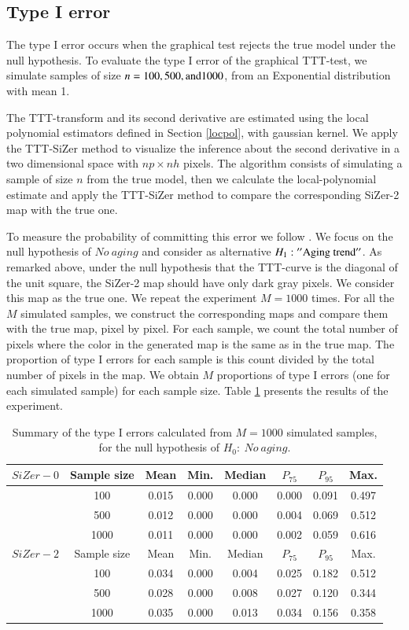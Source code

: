 \documentclass[preprint,12pt]{elsarticle}
\begin{document}
\subsection{Type I error}
The type I error occurs when the graphical test rejects the true model under the null hypothesis. To evaluate the type I error of the graphical TTT-test, we simulate samples of size $n = 100, 500, {\rm and } 1000$, from an Exponential distribution with mean 1.

The TTT-transform and its second derivative are estimated using the local polynomial estimators defined in Section \ref{locpol}, with gaussian kernel. We apply the  TTT-SiZer method to visualize the inference about the second derivative in a two dimensional space with $np \times nh$ pixels.  
The algorithm consists of simulating a sample of size $n$ from the true model, then we calculate the local-polynomial estimate and apply the TTT-SiZer method to compare the corresponding SiZer-2 map with the true one.

To measure the probability of committing this error we follow \cite{RMP07}. We focus on the null hypothesis of $No \ aging$ and consider as alternative $H_1: {\rm ''Aging \ trend''}$.
As remarked above, under the null hypothesis that the TTT-curve is the diagonal of the unit square, the SiZer-2 map  should have only dark gray pixels. We consider this map as the true one. We repeat the experiment $M=1000$ times.  For all the $M$ simulated samples, we construct the corresponding maps and compare them with the true map, pixel by pixel. For each sample, we count the total number of pixels where the color in the generated map is the same as in the true map. The proportion of type I errors for each sample is this count divided by the total number of pixels in the map. We obtain $M$ proportions of type I errors (one for each simulated sample) for each sample size. Table \ref{Tab:errorI} presents the results of the experiment.


\begin{table}[htb]
\centering
\caption{Summary of the type I errors calculated from $M=1000$ simulated samples, for the null hypothesis of $ H_0: \ No \ aging$.}
{\begin{tabular}{r|ccccccc}
 $SiZer-0$      &   Sample size & Mean &   Min.    & Median & $P_{75}$ & $P_{95}$& Max.  \\
\hline
& 100       &0.015 & 0.000  &  0.000 &0.000  & 0.091& 0.497\\
& 500     & 0.012&0.000  &0.000  &0.004  &0.069  &0.512\\
& 1000      &0.011 &0.000  &0.000  &0.002  & 0.059 &0.616\\ \hline \hline
$SiZer-2$ &   Sample size & Mean &   Min.     & Median & $P_{75}$ & $P_{95}$& Max. \\
\hline
& 100       & 0.034& 0.000  & 0.004 & 0.025 & 0.182  &0.512  \\
& 500     & 0.028& 0.000 & 0.008 & 0.027 &0.120  &0.344\\
& 1000      & 0.035& 0.000 & 0.013 & 0.034 &0.156  &0.358\\ \hline \hline

\end{tabular}}
\label{Tab:errorI}
\end{table}
\end{document}
